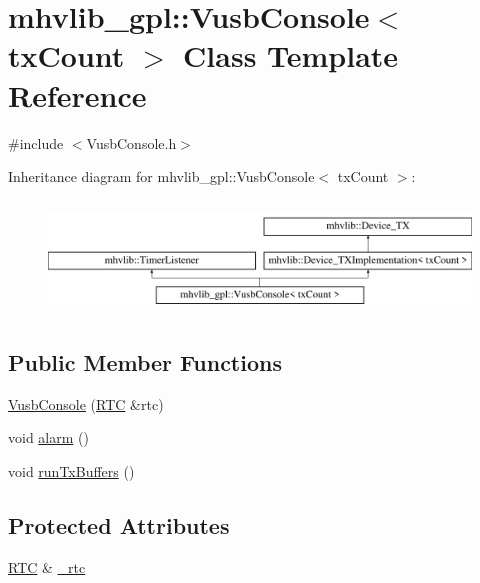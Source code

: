 \hypertarget{classmhvlib__gpl_1_1_vusb_console}{\section{mhvlib\-\_\-gpl\-:\-:Vusb\-Console$<$ tx\-Count $>$ Class Template Reference}
\label{classmhvlib__gpl_1_1_vusb_console}
}


{\ttfamily \#include $<$Vusb\-Console.\-h$>$}

Inheritance diagram for mhvlib\-\_\-gpl\-:\-:Vusb\-Console$<$ tx\-Count $>$\-:\begin{figure}[H]
\begin{center}
\leavevmode
\includegraphics[height=3.000000cm]{classmhvlib__gpl_1_1_vusb_console}
\end{center}
\end{figure}
\subsection*{Public Member Functions}
\begin{DoxyCompactItemize}
\item 
\hyperlink{classmhvlib__gpl_1_1_vusb_console_af977165f50d8f94908fcd0b7800b5f1a}{Vusb\-Console} (\hyperlink{classmhvlib_1_1_r_t_c}{R\-T\-C} \&rtc)
\item 
void \hyperlink{classmhvlib__gpl_1_1_vusb_console_a232cd712200018400618291029ff78b7}{alarm} ()
\item 
void \hyperlink{classmhvlib__gpl_1_1_vusb_console_ada4429ff2cb0230f78f60aeed698952e}{run\-Tx\-Buffers} ()
\end{DoxyCompactItemize}
\subsection*{Protected Attributes}
\begin{DoxyCompactItemize}
\item 
\hyperlink{classmhvlib_1_1_r_t_c}{R\-T\-C} \& \hyperlink{classmhvlib__gpl_1_1_vusb_console_afa40652faf990471baaaf8859cc2d398}{\-\_\-rtc}
\end{DoxyCompactItemize}
